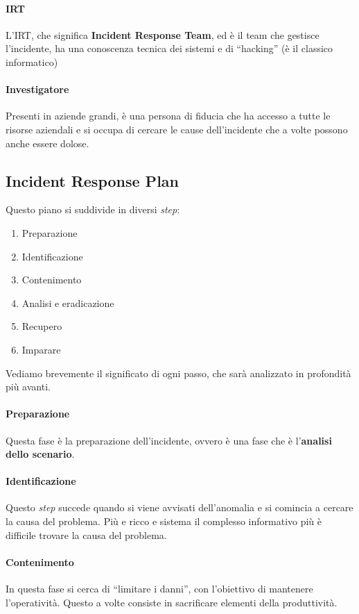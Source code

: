 \paragraph*{IRT} L'IRT, che significa \textbf{Incident Response Team}, ed è il
team che gestisce l'incidente, ha una conoscenza tecnica dei sistemi e di
``hacking'' (è il classico informatico)

\paragraph*{Investigatore} Presenti in aziende grandi, è una persona di fiducia
che ha accesso a tutte le risorse aziendali e si occupa di cercare le cause
dell'incidente che a volte possono anche essere dolose.



\subsection{Incident Response Plan}

Questo piano si suddivide in diversi \textit{step}:
\begin{enumerate}
\item Preparazione
\item Identificazione
\item Contenimento
\item Analisi e eradicazione
\item Recupero
\item Imparare
\end{enumerate}

Vediamo brevemente il significato di ogni passo, che sarà analizzato in
profondità più avanti.

\paragraph*{Preparazione} Questa fase è la preparazione dell'incidente, ovvero è
una fase che è l'\textbf{analisi dello scenario}.

\paragraph*{Identificazione} Questo \textit{step} succede quando si viene
avvisati dell'anomalia e si comincia a cercare la causa del problema. Più e
ricco e sistema il complesso informativo più è difficile trovare la causa del
problema.

\paragraph*{Contenimento} In questa fase si cerca di ``limitare i danni'', con
l'obiettivo di mantenere l'operatività. Questo a volte consiste in sacrificare
elementi della produttività.

